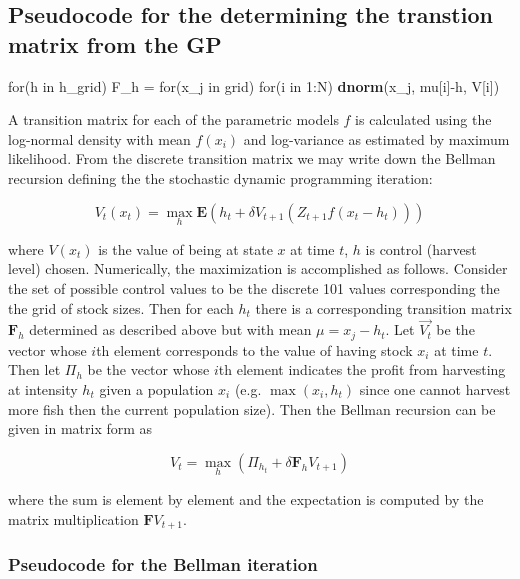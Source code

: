 \documentclass[author-year, review]{elsarticle} %
\newenvironment{Shaded}{}{}
\newcommand{\KeywordTok}[1]{\textcolor[rgb]{0.00,0.44,0.13}{\textbf{{#1}}}}
\newcommand{\DecValTok}[1]{\textcolor[rgb]{0.25,0.63,0.44}{{#1}}}
\newcommand{\StringTok}[1]{\textcolor[rgb]{0.25,0.44,0.63}{{#1}}}
\newcommand{\NormalTok}[1]{{#1}}
\begin{document}
\subsection{Pseudocode for the determining the transtion matrix from the
GP}

\begin{Shaded}
\begin{Highlighting}[]
\NormalTok{for(h in h_grid)}
  \NormalTok{F_h =}\StringTok{ }\NormalTok{for(x_j in grid)}
          \NormalTok{for(i in }\DecValTok{1}\NormalTok{:N) }
            \KeywordTok{dnorm}\NormalTok{(x_j, mu[i]-h, V[i])}
\end{Highlighting}
\end{Shaded}

A transition matrix for each of the parametric models $f$ is calculated
using the log-normal density with mean $f(x_i)$ and log-variance as
estimated by maximum likelihood. From the discrete transition matrix we
may write down the Bellman recursion defining the the stochastic dynamic
programming iteration:

\begin{equation}
V_t(x_t) = \max_h \mathbf{E} \left( h_t + \delta V_{t+1}( Z_{t+1} f(x_t - h_t)) \right)
\end{equation}

where $V(x_t)$ is the value of being at state $x$ at time $t$, $h$ is
control (harvest level) chosen. Numerically, the maximization is
accomplished as follows. Consider the set of possible control values to
be the discrete 101 values corresponding the the grid of stock sizes.
Then for each $h_t$ there is a corresponding transition matrix
$\mathbf{F}_h$ determined as described above but with mean
$\mu = x_j - h_t$. Let $\vec{V_t}$ be the vector whose $i$th element
corresponds to the value of having stock $x_i$ at time $t$. Then let
$\Pi_h$ be the vector whose $i$th element indicates the profit from
harvesting at intensity $h_t$ given a population $x_i$ (e.g.
$\max(x_i, h_t)$ since one cannot harvest more fish then the current
population size). Then the Bellman recursion can be given in matrix form
as

\[V_{t} = \max_h \left( \Pi_{h_{t}} + \delta \mathbf{F}_h V_{t+1} \right)\]

where the sum is element by element and the expectation is computed by
the matrix multiplication $\mathbf{F} V_{t+1}$.

\subsubsection{Pseudocode for the Bellman iteration}
\end{document}
